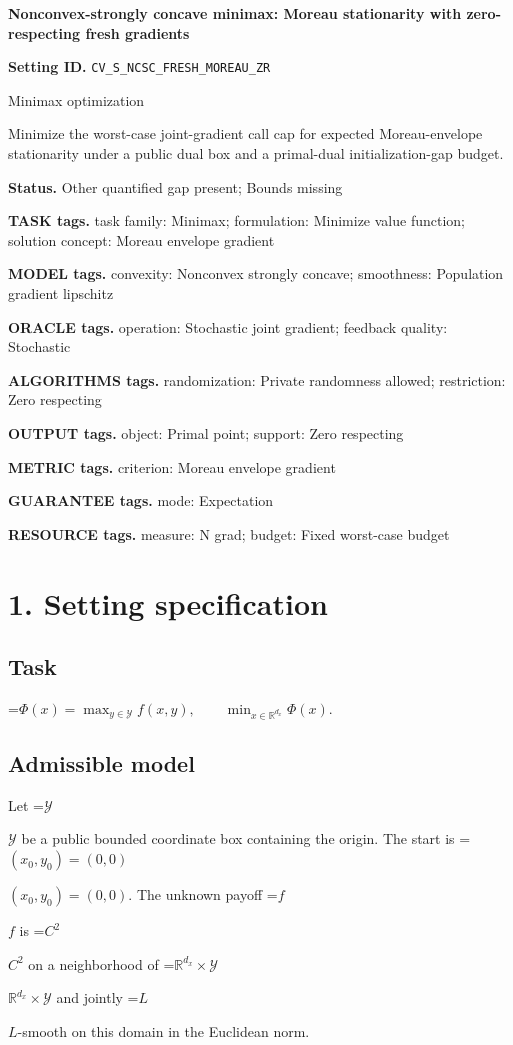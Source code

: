 \documentclass[10pt,a4paper]{article}
\newcommand{\AtlasMath}[1]{\par\begingroup\centering\setbox0=\hbox{$\displaystyle #1$}\ifdim\wd0>1.4\linewidth\typeout{ATLAS WIDE FORMULA: \the\wd0}\fi\ifdim\wd0>\linewidth\resizebox{\linewidth}{!}{\box0}\else\box0\fi\par\endgroup}
\newcommand{\AtlasInlineMath}[1]{\begingroup\setbox0=\hbox{$#1$}\ifdim\wd0>.4\linewidth\endgroup\AtlasMath{#1}\else\endgroup$#1$\fi}
\begin{document}
\raggedright

{\LARGE\bfseries\sffamily\color{AtlasNavy} Nonconvex-strongly concave minimax: Moreau stationarity with zero-respecting fresh gradients\par}\vspace{5pt}
\textbf{Setting ID.} \texttt{CV\_\allowbreak{}S\_\allowbreak{}NCSC\_\allowbreak{}FRESH\_\allowbreak{}MOREAU\_\allowbreak{}ZR}

Minimax optimization

Minimize the worst-case joint-gradient call cap for expected Moreau-envelope stationarity under a public dual box and a primal-dual initialization-gap budget.

\textbf{Status.} Other quantified gap present; Bounds missing

\textbf{TASK tags.} task family: Minimax; formulation: Minimize value function; solution concept: Moreau envelope gradient

\textbf{MODEL tags.} convexity: Nonconvex strongly concave; smoothness: Population gradient lipschitz

\textbf{ORACLE tags.} operation: Stochastic joint gradient; feedback quality: Stochastic

\textbf{ALGORITHMS tags.} randomization: Private randomness allowed; restriction: Zero respecting

\textbf{OUTPUT tags.} object: Primal point; support: Zero respecting

\textbf{METRIC tags.} criterion: Moreau envelope gradient

\textbf{GUARANTEE tags.} mode: Expectation

\textbf{RESOURCE tags.} measure: N grad; budget: Fixed worst-case budget

\section{1. Setting specification}
\subsection{Task}

\AtlasMath{\Phi(x)=\max_{y\in\mathcal Y}f(x,y),\qquad\min_{x\in\mathbb R^{d_x}}\Phi(x).}


\subsection{Admissible model}
Let \AtlasInlineMath{\mathcal Y} be a public bounded coordinate box containing the origin. The start is \AtlasInlineMath{(x_0,y_0)=(0,0)}. The unknown payoff \AtlasInlineMath{f} is \AtlasInlineMath{C^2} on a neighborhood of \AtlasInlineMath{\mathbb R^{d_x}\times\mathcal Y} and jointly \AtlasInlineMath{L}-smooth on this domain in the Euclidean norm.
\end{document}
